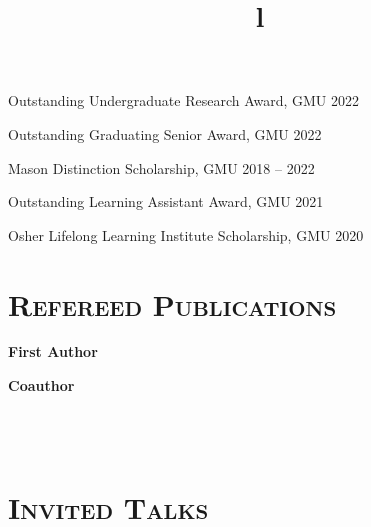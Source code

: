 \documentclass[marg, centered]{res}
\begin{document}
\begin{resume}
{Outstanding Undergraduate Research Award, GMU \hfill 2022}
\vspace{-0.4cm}

{Outstanding Graduating Senior Award, GMU \hfill 2022}
\vspace{-0.4cm}

{Mason Distinction Scholarship, GMU \hfill 2018 -- 2022}
\vspace{-0.4cm}

{Outstanding Learning Assistant Award, GMU \hfill 2021}
\vspace{-0.4cm}

{Osher Lifelong Learning Institute Scholarship, GMU \hfill 2020}
\vspace{-0.0cm}


\section{{\scshape \bfseries Refereed Publications}}

\vspace{-0.1cm}
\textbf{First Author}
\vspace{0.05cm}

\textbf{Coauthor}
\vspace{0.05cm}
\vspace{0.05cm}


\begin{format}
\title{l} \\
 \\
\body
\end{format}

\section{{\scshape \bfseries Invited Talks}}


\end{resume}
\end{document}
